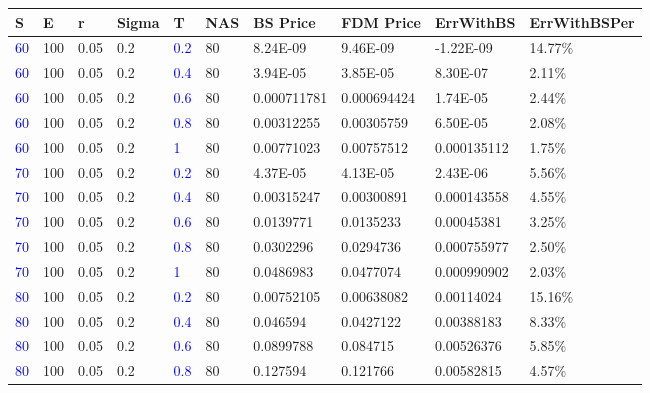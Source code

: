 \documentclass[11pt,oneside,a4paper, titlepage]{article}
\begin{document}
{
\centering
\begin{tabular}{|l|l|l|l|l|l|l|l|l|l|}
\hline
\small{\textbf{S}} & \small{\textbf{E}} & \small{\textbf{r}} & \small{\textbf{Sigma}} & \small{\textbf{T}} & \small{\textbf{NAS}} & \small{\textbf{BS Price}} & \small{\textbf{FDM Price}} & \small{\textbf{ErrWithBS}} &  \small{\textbf{ErrWithBSPer}}\\
\hline
\textcolor{blue}{60} & 100 & 0.05 & 0.2 & \textcolor{blue}{0.2} & 80 & 8.24E-09 & 9.46E-09 & -1.22E-09 & 14.77\%\\
\hline
\textcolor{blue}{60} & 100 & 0.05 & 0.2 & \textcolor{blue}{0.4} & 80 & 3.94E-05 & 3.85E-05 & 8.30E-07 & 2.11\%\\
\hline
\textcolor{blue}{60} & 100 & 0.05 & 0.2 & \textcolor{blue}{0.6} & 80 & 0.000711781 & 0.000694424 & 1.74E-05 & 2.44\%\\
\hline
\textcolor{blue}{60} & 100 & 0.05 & 0.2 & \textcolor{blue}{0.8} & 80 & 0.00312255 & 0.00305759 & 6.50E-05 & 2.08\%\\
\hline
\textcolor{blue}{60} & 100 & 0.05 & 0.2 & \textcolor{blue}{1} & 80 & 0.00771023 & 0.00757512 & 0.000135112 & 1.75\%\\
\hline
\textcolor{blue}{70} & 100 & 0.05 & 0.2 & \textcolor{blue}{0.2} & 80 & 4.37E-05 & 4.13E-05 & 2.43E-06 & 5.56\%\\
\hline
\textcolor{blue}{70} & 100 & 0.05 & 0.2 & \textcolor{blue}{0.4} & 80 & 0.00315247 & 0.00300891 & 0.000143558 & 4.55\%\\
\hline
\textcolor{blue}{70} & 100 & 0.05 & 0.2 & \textcolor{blue}{0.6} & 80 & 0.0139771 & 0.0135233 & 0.00045381 & 3.25\%\\
\hline
\textcolor{blue}{70} & 100 & 0.05 & 0.2 & \textcolor{blue}{0.8} & 80 & 0.0302296 & 0.0294736 & 0.000755977 & 2.50\%\\
\hline
\textcolor{blue}{70} & 100 & 0.05 & 0.2 & \textcolor{blue}{1} & 80 & 0.0486983 & 0.0477074 & 0.000990902 & 2.03\%\\
\hline
\textcolor{blue}{80} & 100 & 0.05 & 0.2 & \textcolor{blue}{0.2} & 80 & 0.00752105 & 0.00638082 & 0.00114024 & 15.16\%\\
\hline
\textcolor{blue}{80} & 100 & 0.05 & 0.2 & \textcolor{blue}{0.4} & 80 & 0.046594 & 0.0427122 & 0.00388183 & 8.33\%\\
\hline
\textcolor{blue}{80} & 100 & 0.05 & 0.2 & \textcolor{blue}{0.6} & 80 & 0.0899788 & 0.084715 & 0.00526376 & 5.85\%\\
\hline
\textcolor{blue}{80} & 100 & 0.05 & 0.2 & \textcolor{blue}{0.8} & 80 & 0.127594 & 0.121766 & 0.00582815 & 4.57\%\\

\end{tabular}}
\end{document}
